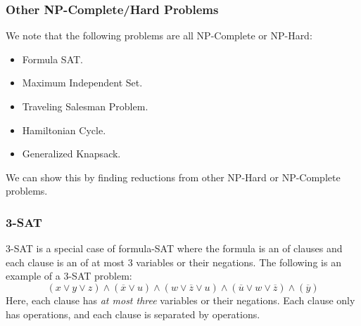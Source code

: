 \documentclass[letterpaper]{article}
\begin{document}
\subsubsection{Other NP-Complete/Hard Problems}
We note that the following problems are all NP-Complete or NP-Hard: 
\begin{itemize}
    \item Formula SAT. 
    \item Maximum Independent Set. 
    \item Traveling Salesman Problem. 
    \item Hamiltonian Cycle. 
    \item Generalized Knapsack. 
\end{itemize}
We can show this by finding reductions from other NP-Hard or NP-Complete problems. 

\subsubsection{3-SAT}
3-SAT is a special case of formula-SAT where the formula is an  of clauses and each clause is an  of at most 3 variables or their negations. The following is an example of a 3-SAT problem: 
\[(x \lor y \lor z) \land (\overline{x} \lor u) \land (w \lor \overline{z} \lor u) \land (\overline{u} \lor w \lor \overline{z}) \land (\overline{y})\]
Here, each clause has \emph{at most three} variables or their negations. Each clause only has  operations, and each clause is separated by  operations. 
\end{document}
